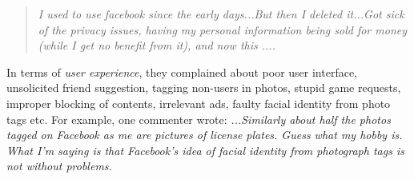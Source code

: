 \begin{quote}
         \textit{I used to use facebook since the early days...But then I deleted it...Got sick of the privacy issues, having my personal information being sold for money (while I get no benefit from it), and now this ....}

\end{quote}

In terms of \textit{user experience}, they complained about poor user interface, unsolicited friend suggestion, tagging non-users in photos, stupid game requests, improper blocking of contents, irrelevant ads, faulty facial identity from photo tags etc. For example, one commenter wrote: \textit{...Similarly about half the photos tagged on Facebook as me are pictures of license plates. Guess what my hobby is. What I'm saying is that Facebook's idea of facial identity from photograph tags is not without problems.} 

